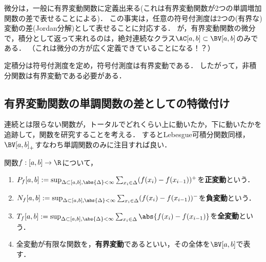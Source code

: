 \documentclass[uplatex, dvipdfmx]{jsreport}
\begin{document}
\begin{tcolorbox}[colframe=ForestGreen, colback=ForestGreen!10!white,breakable,colbacktitle=ForestGreen!40!white,coltitle=black,fonttitle=\bfseries\sffamily,
title=正錐上の議論を一般化するときが来た]
    微分は，一般に有界変動関数に定義出来る(これは有界変動関数が2つの単調増加関数の差で表せることによる)．
    この事実は，任意の符号付測度は2つの(有界な)変動の差(Jordan分解)として表せることに対応する．
    が，有界変動関数の微分で，積分として返って来れるのは，絶対連続なクラス$\AC[a,b]\subset\BV[a,b]$のみである．
    （これは微分の方が広く定義できていることになる！？）
\end{tcolorbox}

\begin{remarks}[非積分関数の有界変動性について]
    定積分は符号付測度を定め，符号付測度は有界変動である．
    したがって，非積分関数は有界変動である必要がある．
\end{remarks}

\subsection{有界変動関数の単調関数の差としての特徴付け}

\begin{tcolorbox}[colframe=ForestGreen, colback=ForestGreen!10!white,breakable,colbacktitle=ForestGreen!40!white,coltitle=black,fonttitle=\bfseries\sffamily,
title=]
    連続とは限らない関数が，トータルでどれくらい上に動いたか，下に動いたかを追跡して，関数を研究することを考える．
    するとLebesgue可積分関数同様，$\BV[a,b]_+$すなわち単調関数のみに注目すれば良い．
\end{tcolorbox}

\begin{definition}
    関数$f:[a,b]\to\R$について，
    \begin{enumerate}
        \item $P_f[a,b]:=\sup_{\Delta\subset[a,b],\abs{\Delta}<\infty}\sum_{x_i\in\Delta}(f(x_i)-f(x_{i-1}))^+$を\textbf{正変動}という．
        \item $N_f[a,b]:=\sup_{\Delta\subset[a,b],\abs{\Delta}<\infty}\sum_{x_i\in\Delta}(f(x_i)-f(x_{i-1}))^-$を\textbf{負変動}という．
        \item $T_f[a,b]:=\sup_{\Delta\subset[a,b],\abs{\Delta}<\infty}\sum_{x_i\in\Delta}\abs{f(x_i)-f(x_{i-1})}$を\textbf{全変動}という．
        \item 全変動が有限な関数を，\textbf{有界変動}であるといい，その全体を$\BV[a,b]$で表す．
    \end{enumerate}
\end{definition}
\end{document}
